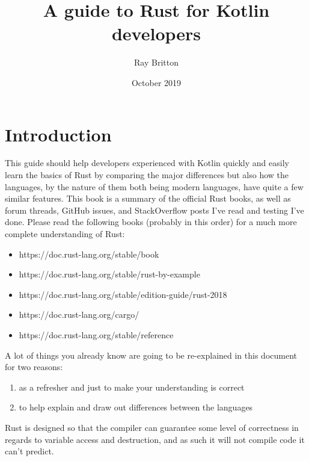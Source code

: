 \documentclass[a4paper,11pt]{article}
\begin{document}
\lstset{basicstyle=\ttfamily\footnotesize,breaklines=true}
\lstset{language=Rust, style=colouredRust}
\setlength{\parindent}{0mm}
\sffamily

\title{A guide to Rust for Kotlin developers}
\author{Ray Britton}
\date{October 2019}

\maketitle

\newpage
{}
\tableofcontents

\newpage
{}
\section{Introduction}

This guide should help developers experienced with Kotlin quickly and easily learn the basics of Rust by comparing the major differences but also how the languages, by the nature of them both being modern languages, have quite a few similar features.
\newline
\newline
This book is a summary of the official Rust books, as well as forum threads, GitHub issues, and StackOverflow posts I've read and testing I've done.
Please read the following books (probably in this order) for a much more complete understanding of Rust:
\begin{itemize}
  \item https://doc.rust-lang.org/stable/book
  \item https://doc.rust-lang.org/stable/rust-by-example
  \item https://doc.rust-lang.org/stable/edition-guide/rust-2018
  \item https://doc.rust-lang.org/cargo/
  \item https://doc.rust-lang.org/stable/reference
\end{itemize}
A lot of things you already know are going to be re-explained in this document for two reasons:
\begin{enumerate}
	\item as a refresher and just to make your understanding is correct
	\item to help explain and draw out differences between the languages
\end{enumerate}
Rust is designed so that the compiler can guarantee some level of correctness in regards to variable access and destruction, and as such it will not compile code it can't predict.
\end{document}
